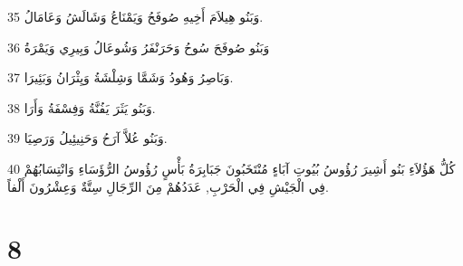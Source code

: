 \par 35 وَبَنُو هِيلاَمَ أَخِيهِ صُوفَحُ وَيَمْنَاعُ وَشَالَشُ وَعَامَالُ.
\par 36 وَبَنُو صُوفَحَ سُوحُ وَحَرَنْفَرُ وَشُوعَالُ وَبِيرِي وَيَمْرَةُ
\par 37 وَبَاصِرُ وَهُودُ وَشَمَّا وَشِلْشَةُ وَيِثْرَانُ وَبَئِيرَا.
\par 38 وَبَنُو يَثَرَ يَفُنَّةُ وَفِسْفَةُ وَأَرَا.
\par 39 وَبَنُو عُلاَّ آرَحُ وَحَنِيئِيلُ وَرَصِيَا.
\par 40 كُلُّ هَؤُلاَءِ بَنُو أَشِيرَ رُؤُوسُ بُيُوتِ آبَاءٍ مُنْتَخَبُونَ جَبَابِرَةُ بَأْسٍ رُؤُوسُ الرُّؤَسَاءِ وَانْتِسَابُهُمْ فِي الْجَيْشِ فِي الْحَرْبِ, عَدَدُهُمْ مِنَ الرِّجَالِ سِتَّةٌ وَعِشْرُونَ أَلْفاً.

\chapter{8}

